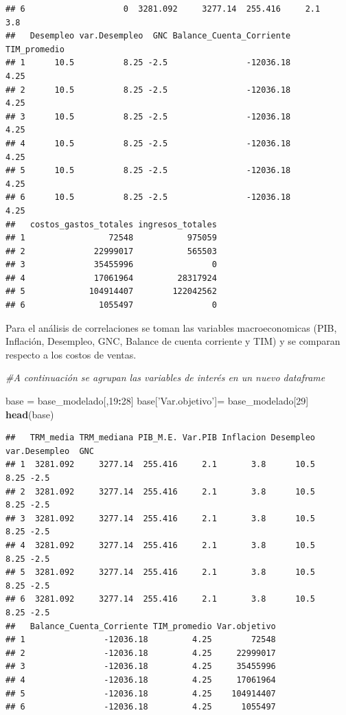 \documentclass[
  11pt,
]{book}
\newenvironment{Shaded}{\begin{snugshade}}{\end{snugshade}}
\newcommand{\CommentTok}[1]{\textcolor[rgb]{0.56,0.35,0.01}{\textit{#1}}}
\newcommand{\DecValTok}[1]{\textcolor[rgb]{0.00,0.00,0.81}{#1}}
\newcommand{\KeywordTok}[1]{\textcolor[rgb]{0.13,0.29,0.53}{\textbf{#1}}}
\newcommand{\NormalTok}[1]{#1}
\newcommand{\OperatorTok}[1]{\textcolor[rgb]{0.81,0.36,0.00}{\textbf{#1}}}
\newcommand{\StringTok}[1]{\textcolor[rgb]{0.31,0.60,0.02}{#1}}
\begin{document}
\begin{verbatim}
## 6                    0  3281.092     3277.14  255.416     2.1       3.8
##   Desempleo var.Desempleo  GNC Balance_Cuenta_Corriente TIM_promedio
## 1      10.5          8.25 -2.5                -12036.18         4.25
## 2      10.5          8.25 -2.5                -12036.18         4.25
## 3      10.5          8.25 -2.5                -12036.18         4.25
## 4      10.5          8.25 -2.5                -12036.18         4.25
## 5      10.5          8.25 -2.5                -12036.18         4.25
## 6      10.5          8.25 -2.5                -12036.18         4.25
##   costos_gastos_totales ingresos_totales
## 1                 72548           975059
## 2              22999017           565503
## 3              35455996                0
## 4              17061964         28317924
## 5             104914407        122042562
## 6               1055497                0
\end{verbatim}

Para el análisis de correlaciones se toman las variables macroeconomicas
(PIB, Inflación, Desempleo, GNC, Balance de cuenta corriente y TIM) y se
comparan respecto a los costos de ventas.

\begin{Shaded}
\begin{Highlighting}[]
\CommentTok{#A continuación se agrupan las variables de interés en un nuevo dataframe}

\NormalTok{base =}\StringTok{ }\NormalTok{base_modelado[,}\DecValTok{19}\OperatorTok{:}\DecValTok{28}\NormalTok{]}
\NormalTok{base[}\StringTok{'Var.objetivo'}\NormalTok{]=}\StringTok{ }\NormalTok{base_modelado[}\DecValTok{29}\NormalTok{]}
\KeywordTok{head}\NormalTok{(base)}
\end{Highlighting}
\end{Shaded}

\begin{verbatim}
##   TRM_media TRM_mediana PIB_M.E. Var.PIB Inflacion Desempleo var.Desempleo  GNC
## 1  3281.092     3277.14  255.416     2.1       3.8      10.5          8.25 -2.5
## 2  3281.092     3277.14  255.416     2.1       3.8      10.5          8.25 -2.5
## 3  3281.092     3277.14  255.416     2.1       3.8      10.5          8.25 -2.5
## 4  3281.092     3277.14  255.416     2.1       3.8      10.5          8.25 -2.5
## 5  3281.092     3277.14  255.416     2.1       3.8      10.5          8.25 -2.5
## 6  3281.092     3277.14  255.416     2.1       3.8      10.5          8.25 -2.5
##   Balance_Cuenta_Corriente TIM_promedio Var.objetivo
## 1                -12036.18         4.25        72548
## 2                -12036.18         4.25     22999017
## 3                -12036.18         4.25     35455996
## 4                -12036.18         4.25     17061964
## 5                -12036.18         4.25    104914407
## 6                -12036.18         4.25      1055497
\end{verbatim}
\end{document}
